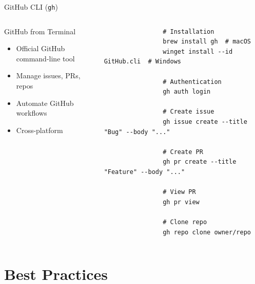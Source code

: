 \documentclass[aspectratio=169]{beamer}
\begin{document}
	\begin{frame}{GitHub CLI (\texttt{gh})}
		\begin{columns}
			\begin{block}{GitHub from Terminal}
				\begin{itemize}
					\item Official GitHub command-line tool
					\item Manage issues, PRs, repos
					\item Automate GitHub workflows
					\item Cross-platform
				\end{itemize}
			\end{block}
			
			\begin{verbatim}
				# Installation
				brew install gh  # macOS
				winget install --id GitHub.cli  # Windows
				
				# Authentication
				gh auth login
				
				# Create issue
				gh issue create --title "Bug" --body "..."
				
				# Create PR
				gh pr create --title "Feature" --body "..."
				
				# View PR
				gh pr view
				
				# Clone repo
				gh repo clone owner/repo
			\end{verbatim}
		\end{columns}
	\end{frame}
	
	\section{Best Practices}
	
\end{document}
